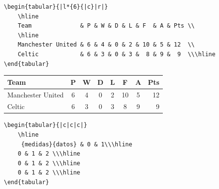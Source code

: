 \documentclass[a4,10pt]{aleph-notas}
\begin{document}


\vspace{12pt}

\begin{lstlisting}[frame=single]
\begin{tabular}{|l*{6}{|c}|r|}
    \hline
    Team              & P & W & D & L & F  & A & Pts \\
    \hline
    Manchester United & 6 & 4 & 0 & 2 & 10 & 5 & 12  \\
    Celtic            & 6 & 3 & 0 & 3 &  8 & 9 &  9  \\\hline
\end{tabular}
\end{lstlisting}

\begin{center}
    \begin{tabular}{|l*{6}{|c}|r|}
\hline
Team              & P & W & D & L & F  & A & Pts \\
\hline
Manchester United & 6 & 4 & 0 & 2 & 10 & 5 & 12  \\
Celtic            & 6 & 3 & 0 & 3 &  8 & 9 &  9  \\\hline
\end{tabular}
\end{center}

\vspace{18pt}

\begin{lstlisting}[frame=single]
\begin{tabular}{|c|c|c|}
    \hline
     {medidas}{datos} & 0 & 1\\\hline
    0 & 1 & 2 \\\hline
    0 & 1 & 2 \\\hline
    0 & 1 & 2 \\\hline
\end{tabular}
\end{lstlisting}
\end{document}
